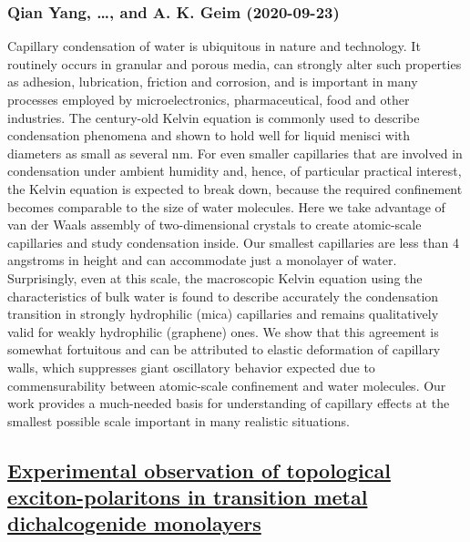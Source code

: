 \subsubsection*{Qian Yang, \dots, and A. K. Geim (2020-09-23)}
Capillary condensation of water is ubiquitous in nature and technology. It
routinely occurs in granular and porous media, can strongly alter such
properties as adhesion, lubrication, friction and corrosion, and is important
in many processes employed by microelectronics, pharmaceutical, food and other
industries. The century-old Kelvin equation is commonly used to describe
condensation phenomena and shown to hold well for liquid menisci with diameters
as small as several nm. For even smaller capillaries that are involved in
condensation under ambient humidity and, hence, of particular practical
interest, the Kelvin equation is expected to break down, because the required
confinement becomes comparable to the size of water molecules. Here we take
advantage of van der Waals assembly of two-dimensional crystals to create
atomic-scale capillaries and study condensation inside. Our smallest
capillaries are less than 4 angstroms in height and can accommodate just a
monolayer of water. Surprisingly, even at this scale, the macroscopic Kelvin
equation using the characteristics of bulk water is found to describe
accurately the condensation transition in strongly hydrophilic (mica)
capillaries and remains qualitatively valid for weakly hydrophilic (graphene)
ones. We show that this agreement is somewhat fortuitous and can be attributed
to elastic deformation of capillary walls, which suppresses giant oscillatory
behavior expected due to commensurability between atomic-scale confinement and
water molecules. Our work provides a much-needed basis for understanding of
capillary effects at the smallest possible scale important in many realistic
situations.

\subsection*{\href{http://arxiv.org/abs/2009.11237v1}{Experimental observation of topological exciton-polaritons in transition  metal dichalcogenide monolayers}}
